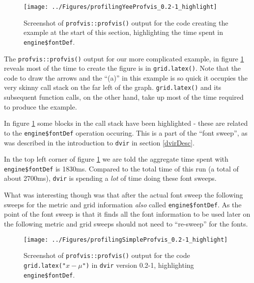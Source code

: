 \documentclass[]{article}
\begin{document}
\begin{figure}

{\centering \texttt{[image: ../Figures/profilingYeeProfvis\_0.2-1\_highlight]} 

}

\caption{Screenshot of \texttt{profvis::profvis()} output for the code creating the example at the start of this section, highlighting the time spent in \texttt{engine\$fontDef}.}\label{fig:prof2}
\end{figure}

The \texttt{profvis::profvis()} output for our more complicated example,
in figure \ref{fig:prof2} reveals most of the time to create the figure
is in \texttt{grid.latex()}. Note that the code to draw the arrows and
the ``(a)'' in this example is so quick it occupies the very skinny call
stack on the far left of the graph. \texttt{grid.latex()} and its
subsequent function calls, on the other hand, take up most of the time
required to produce the example.

In figure \ref{fig:prof2} some blocks in the call stack have been
highlighted - these are related to the \texttt{engine\$fontDef}
operation occuring. This is a part of the ``font sweep'', as was
described in the introduction to \texttt{dvir} in section
\ref{dvirDesc}.

In the top left corner of figure \ref{fig:prof2} we are told the
aggregate time spent with \texttt{engine\$fontDef} is 1830ms. Compared
to the total time of this run (a total of about 2700ms), \texttt{dvir}
is spending a \emph{lot} of time doing these font sweeps.

What was interesting though was that after the actual font sweep the
following sweeps for the metric and grid information \emph{also} called
\texttt{engine\$fontDef}. As the point of the font sweep is that it
finds all the font information to be used later on the following metric
and grid sweeps should not need to ``re-sweep'' for the fonts.

\begin{figure}

{\centering \texttt{[image: ../Figures/profilingSimpleProfvis\_0.2-1\_highlight]} 

}

\caption{Screenshot of \texttt{profvis::profvis()} output for the code \texttt{grid.latex("$x - \mu$")} in \texttt{dvir} version 0.2-1, highlighting \texttt{engine\$fontDef}.}\label{fig:prof3}
\end{figure}
\end{document}
